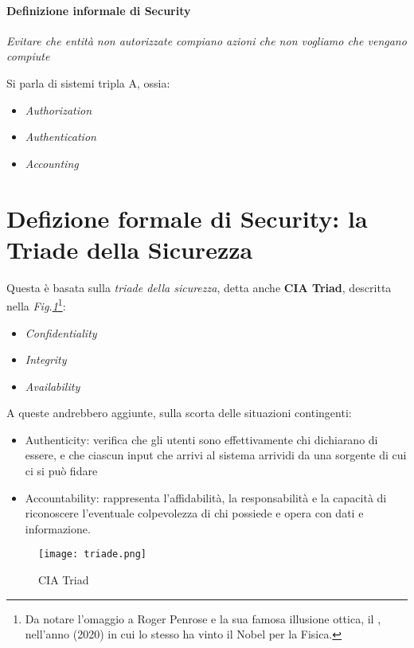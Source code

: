 \documentclass[14pt]{extreport}
\begin{document}
\paragraph{Definizione informale di Security}
\textit{Evitare che entità non autorizzate compiano azioni che non vogliamo che vengano compiute}

Si parla di sistemi tripla A, ossia:

\begin{itemize}
    \item \textit{Authorization}
    \item \textit{Authentication}
    \item \textit{Accounting}
\end{itemize}



\section{Defizione formale di Security: la Triade della Sicurezza}
Questa è basata sulla \textit{triade della sicurezza}, detta anche \textbf{CIA Triad}\cite{stallings}, descritta nella \textit{Fig.\ref{triad}}\footnote{Da notare l'omaggio a Roger Penrose e la sua famosa illusione ottica, il , nell'anno (2020) in cui lo stesso ha vinto il Nobel per la Fisica.}:
\begin{itemize}
    \item \textit{Confidentiality}
    \item \textit{Integrity}
    \item \textit{Availability}
\end{itemize}

A queste andrebbero aggiunte, sulla scorta delle situazioni contingenti\cite{stallings}:
\begin{itemize}
    \item Authenticity: verifica che gli utenti sono effettivamente chi dichiarano di essere, e che ciascun input che arrivi al sistema arrividi da una sorgente di cui ci si può fidare
    \item Accountability: rappresenta l'affidabilità, la responsabilità e la capacità di riconoscere l'eventuale colpevolezza di chi possiede e opera con dati e informazione.
\end{itemize}



\begin{figure}[H]
    \centering
    \texttt{[image: triade.png]}
    \caption{CIA Triad}
    \label{triad}
\end{figure}
\end{document}
